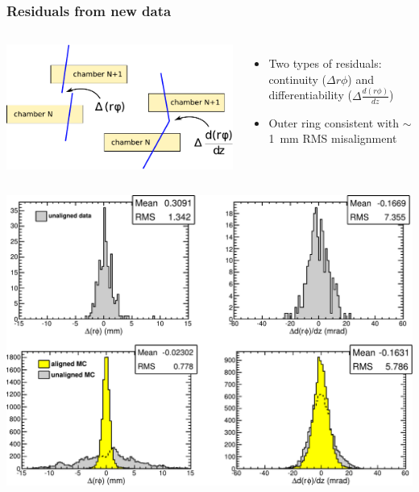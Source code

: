 \documentclass[compress]{beamer}
\begin{document}
\begin{frame}
\frametitle{Residuals from new data}
\begin{columns}
\includegraphics[width=\linewidth]{residuals_diagrams.pdf}

\begin{itemize}
\item Two types of residuals: continuity ($\Delta r\phi$) and differentiability ($\Delta \frac{d(r\phi)}{dz}$)
\item Outer ring consistent with $\sim$1~mm RMS misalignment
\end{itemize}
\end{columns}

\begin{center}
\includegraphics[width=0.8\linewidth]{outer_residuals.pdf}
\end{center}
\end{frame}
\end{document}
